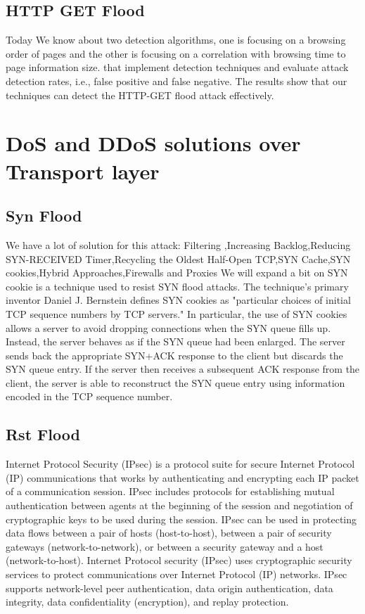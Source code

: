 \documentclass{report}
\begin{document}
\subsection {HTTP GET Flood} Today We know about two detection algorithms, one is focusing on a browsing order of pages and the other is focusing on a correlation with browsing time to page information size. that implement detection techniques and evaluate attack detection rates, i.e., false positive and false negative. The results show that our techniques can detect the HTTP-GET flood attack effectively.


\section {DoS and DDoS solutions over Transport layer} 

\subsection{Syn Flood} We have a lot of solution for this attack:
Filtering ,Increasing Backlog,Reducing SYN-RECEIVED Timer,Recycling the Oldest Half-Open TCP,SYN Cache,SYN cookies,Hybrid Approaches,Firewalls and Proxies
We will expand a bit on SYN cookie is a technique used to resist SYN flood attacks. The technique's primary inventor Daniel J. Bernstein defines SYN cookies as "particular choices of initial TCP sequence numbers by TCP servers." In particular, the use of SYN cookies allows a server to avoid dropping connections when the SYN queue fills up. Instead, the server behaves as if the SYN queue had been enlarged. The server sends back the appropriate SYN+ACK response to the client but discards the SYN queue entry. If the server then receives a subsequent ACK response from the client, the server is able to reconstruct the SYN queue entry using information encoded in the TCP sequence number.

\subsection {Rst Flood}  Internet Protocol Security (IPsec) is a protocol suite for secure Internet Protocol (IP) communications that works by authenticating and encrypting each IP packet of a communication session. IPsec includes protocols for establishing mutual authentication between agents at the beginning of the session and negotiation of cryptographic keys to be used during the session. IPsec can be used in protecting data flows between a pair of hosts (host-to-host), between a pair of security gateways (network-to-network), or between a security gateway and a host (network-to-host). Internet Protocol security (IPsec) uses cryptographic security services to protect communications over Internet Protocol (IP) networks. IPsec supports network-level peer authentication, data origin authentication, data integrity, data confidentiality (encryption), and replay protection.
\end{document}
